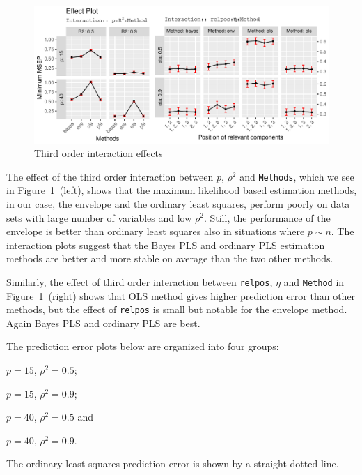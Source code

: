 \documentclass[num-refs]{wiley-article}
\begin{document}
\begin{figure}[!ht]
\centering
\includegraphics[width=\textwidth]{effect-plot}
\caption{Third order interaction effects}
\label{fig:effect-plot}
\end{figure}

The effect of the third order interaction between $p$, $\rho^2$ and {\tt Methods}, which we see in Figure~1~(left), shows that the maximum likelihood based estimation methods, in our case, the envelope and the ordinary least squares, perform poorly on data sets with large number of variables and low $\rho^2$. Still, the performance of the envelope is better than ordinary least squares also in situations where $p\sim n$. The interaction plots suggest that the Bayes PLS and ordinary PLS estimation methods are better and more stable on average than the two other methods.

Similarly, the effect of third order interaction between {\tt relpos}, $\eta$ and {\tt Method} in Figure~1~(right) shows that OLS method gives higher prediction error than other methods, but the effect of {\tt relpos} is small but notable for the envelope method. Again Bayes PLS and ordinary PLS are best.

The prediction error plots below are organized into four groups:
\begin{enumerate*}[label = \alph*)]
\item \label{lst:g1} $p = 15$, $\rho^2 = 0.5$;
\item \label{lst:g2} $p = 15$, $\rho^2 = 0.9$;
\item \label{lst:g3} $p = 40$, $\rho^2 = 0.5$ and
\item \label{lst:g4} $p = 40$, $\rho^2 = 0.9$.
\end{enumerate*}
The ordinary least squares prediction error is shown by a straight dotted line.

\end{document}
